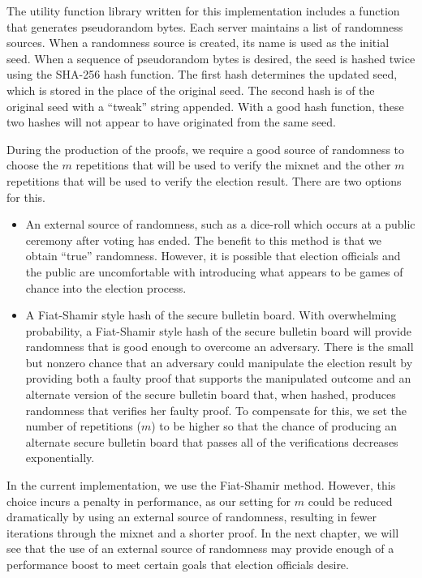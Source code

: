 The utility function library written for this implementation includes a function that generates pseudorandom bytes. Each server maintains a list of randomness sources. When a randomness source is created, its name is used as the initial seed. When a sequence of pseudorandom bytes is desired, the seed is hashed twice using the SHA-256 hash function. The first hash determines the updated seed, which is stored in the place of the original seed. The second hash is of the original seed with a ``tweak'' string appended. With a good hash function, these two hashes will not appear to have originated from the same seed.

During the production of the proofs, we require a good source of randomness to choose the $m$ repetitions that will be used to verify the mixnet and the other $m$ repetitions that will be used to verify the election result. There are two options for this.

\begin{itemize}
\item An external source of randomness, such as a dice-roll which occurs at a public ceremony after voting has ended. The benefit to this method is that we obtain ``true'' randomness. However, it is possible that election officials and the public are uncomfortable with introducing what appears to be games of chance into the election process.
\item A Fiat-Shamir style hash of the secure bulletin board. With overwhelming probability, a Fiat-Shamir style hash of the secure bulletin board will provide randomness that is good enough to overcome an adversary. There is the small but nonzero chance that an adversary could manipulate the election result by providing both a faulty proof that supports the manipulated outcome and an alternate version of the secure bulletin board that, when hashed, produces randomness that verifies her faulty proof. To compensate for this, we set the number of repetitions ($m$) to be higher so that the chance of producing an alternate secure bulletin board that passes all of the verifications decreases exponentially.
\end{itemize}

In the current implementation, we use the Fiat-Shamir method. However, this choice incurs a penalty in performance, as our setting for $m$ could be reduced dramatically by using an external source of randomness, resulting in fewer iterations through the mixnet and a shorter proof. In the next chapter, we will see that the use of an external source of randomness may provide enough of a performance boost to meet certain goals that election officials desire.

